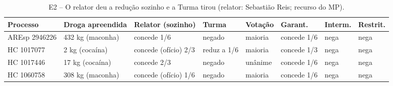 \begin{table}[h]
\centering\small
\caption{E2 -- O relator deu a redução sozinho e a Turma tirou (relator: Sebastião Reis; recurso do MP).}
\label{tab:e2}
\begin{adjustbox}{max width=\textwidth}
\begin{tabular}{llllllll}
\toprule
Processo & Droga apreendida & Relator (sozinho) & Turma & Votação & Garant. & Interm. & Restrit. \\
\midrule
AREsp 2946226 & 432 kg (maconha) & concede 1/6 & negado & maioria & concede 1/6 & nega & nega \\
HC 1017077 & 2 kg (cocaína) & concede (ofício) 2/3 & reduz a 1/6 & maioria & concede 1/3 & nega & nega \\
HC 1017446 & 17 kg (cocaína) & concede 2/3 & negado & unânime & concede 1/6 & nega & nega \\
HC 1060758 & 308 kg (maconha) & concede (ofício) 1/6 & negado & maioria & concede 1/6 & nega & nega \\
\bottomrule
\end{tabular}
\end{adjustbox}
\end{table}
